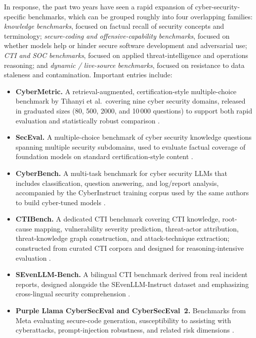 \documentclass[unnumsec,webpdf,contemporary,large]{oup-authoring-template}
\theoremstyle{thmstyleone}
\theoremstyle{thmstyletwo}
\theoremstyle{thmstylethree}
\begin{document}
In response, the past two years have seen a rapid expansion of cyber-security-specific benchmarks, which can be grouped roughly into four overlapping families: \emph{knowledge benchmarks}, focused on factual recall of security concepts and terminology; \emph{secure-coding and offensive-capability benchmarks}, focused on whether models help or hinder secure software development and adversarial use; \emph{CTI and SOC benchmarks}, focused on applied threat-intelligence and operations reasoning; and \emph{dynamic / live-source benchmarks}, focused on resistance to data staleness and contamination. Important entries include:

\begin{itemize}
  \item \textbf{CyberMetric.} A retrieval-augmented, certification-style multiple-choice benchmark by Tihanyi et al.\ covering nine cyber security domains, released in graduated sizes (80, 500, 2000, and 10\,000 questions) to support both rapid evaluation and statistically robust comparison \cite{tihanyi2024cybermetric}.
  \item \textbf{SecEval.} A multiple-choice benchmark of cyber security knowledge questions spanning multiple security subdomains, used to evaluate factual coverage of foundation models on standard certification-style content \cite{hu2024seceval}.
  \item \textbf{CyberBench.} A multi-task benchmark for cyber security LLMs that includes classification, question answering, and log/report analysis, accompanied by the CyberInstruct training corpus used by the same authors to build cyber-tuned models \cite{liu2024cyberbench}.
  \item \textbf{CTIBench.} A dedicated CTI benchmark covering CTI knowledge, root-cause mapping, vulnerability severity prediction, threat-actor attribution, threat-knowledge graph construction, and attack-technique extraction; constructed from curated CTI corpora and designed for reasoning-intensive evaluation \cite{alam2024ctibench}.
  \item \textbf{SEvenLLM-Bench.} A bilingual CTI benchmark derived from real incident reports, designed alongside the SEvenLLM-Instruct dataset and emphasizing cross-lingual security comprehension \cite{ji2024sevenllm}.
  \item \textbf{Purple Llama CyberSecEval and CyberSecEval~2.} Benchmarks from Meta evaluating secure-code generation, susceptibility to assisting with cyberattacks, prompt-injection robustness, and related risk dimensions \cite{bhatt2023purplellama,bhatt2024cyberseceval2}.

\end{itemize}
\end{document}
